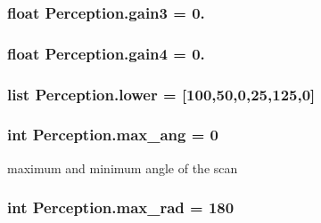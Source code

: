 \subsubsection[{\texorpdfstring{gain3}{gain3}}]{\setlength{\rightskip}{0pt plus 5cm}float Perception.\+gain3 = 0.}\hypertarget{namespacePerception_a229e55dde1fafbfa34e1ed76f9dab9a7}{}\label{namespacePerception_a229e55dde1fafbfa34e1ed76f9dab9a7}
\subsubsection[{\texorpdfstring{gain4}{gain4}}]{\setlength{\rightskip}{0pt plus 5cm}float Perception.\+gain4 = 0.}\hypertarget{namespacePerception_a1149af80a55cce4661c985f8d4ca15ae}{}\label{namespacePerception_a1149af80a55cce4661c985f8d4ca15ae}
\subsubsection[{\texorpdfstring{lower}{lower}}]{\setlength{\rightskip}{0pt plus 5cm}list Perception.\+lower = \mbox{[}100,50,0,25,125,0\mbox{]}}\hypertarget{namespacePerception_a4166a4d5dfba1d1c65be4e69bed3a442}{}\label{namespacePerception_a4166a4d5dfba1d1c65be4e69bed3a442}
\subsubsection[{\texorpdfstring{max\+\_\+ang}{max_ang}}]{\setlength{\rightskip}{0pt plus 5cm}int Perception.\+max\+\_\+ang = 0}\hypertarget{namespacePerception_a32c9e49968ea4ea21f1afbe28dc236cc}{}\label{namespacePerception_a32c9e49968ea4ea21f1afbe28dc236cc}


maximum and minimum angle of the scan 

\subsubsection[{\texorpdfstring{max\+\_\+rad}{max_rad}}]{\setlength{\rightskip}{0pt plus 5cm}int Perception.\+max\+\_\+rad = 180}\hypertarget{namespacePerception_a25e59ac83c977a1cd1752b677923c0d8}{}\label{namespacePerception_a25e59ac83c977a1cd1752b677923c0d8}


